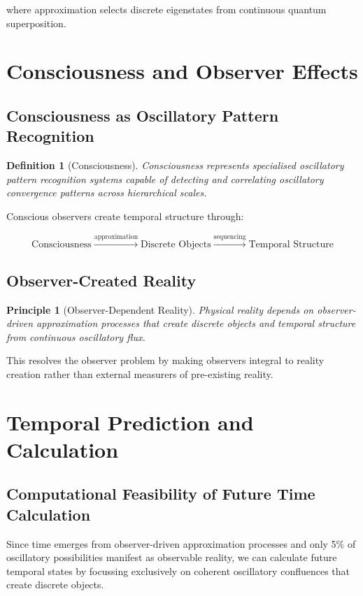 \documentclass[11pt]{article}
\newtheorem{definition}[theorem]{Definition}
\newtheorem{principle}[theorem]{Principle}
\theoremstyle{remark}
\begin{document}
where approximation selects discrete eigenstates from continuous quantum superposition.

\section{Consciousness and Observer Effects}

\subsection{Consciousness as Oscillatory Pattern Recognition}

\begin{definition}[Consciousness]
Consciousness represents specialised oscillatory pattern recognition systems capable of detecting and correlating oscillatory convergence patterns across hierarchical scales.
\end{definition}

Conscious observers create temporal structure through:

$$\text{Consciousness} \xrightarrow{\text{approximation}} \text{Discrete Objects} \xrightarrow{\text{sequencing}} \text{Temporal Structure}$$

\subsection{Observer-Created Reality}

\begin{principle}[Observer-Dependent Reality]
Physical reality depends on observer-driven approximation processes that create discrete objects and temporal structure from continuous oscillatory flux.
\end{principle}

This resolves the observer problem by making observers integral to reality creation rather than external measurers of pre-existing reality.

\section{Temporal Prediction and Calculation}

\subsection{Computational Feasibility of Future Time Calculation}

Since time emerges from observer-driven approximation processes and only 5\% of oscillatory possibilities manifest as observable reality, we can calculate future temporal states by focussing exclusively on coherent oscillatory confluences that create discrete objects.
\end{document}
